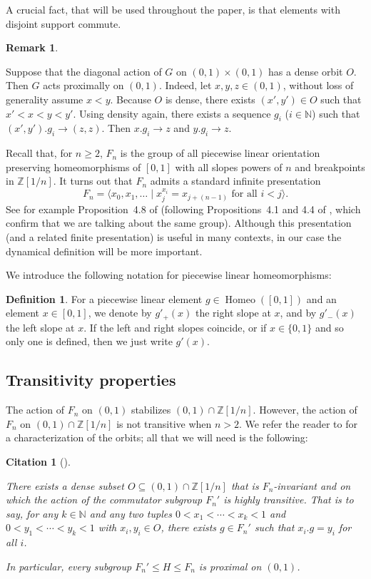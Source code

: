 \documentclass[reqno,12pt]{amsart}\setcounter{tocdepth}{1}
\newtheorem{cit}[theorem]{Citation}
\theoremstyle{definition}
\newtheorem{definition}[theorem]{Definition}
\newtheorem{remark}[theorem]{Remark}
\newcommand{\N}{\mathbb{N}}
\newcommand{\Z}{\mathbb{Z}}
\DeclareMathOperator{\Homeo}{Homeo}
\numberwithin{equation}{section}
\begin{document}
A crucial fact, that will be used throughout the paper, is that elements with disjoint support commute.

\begin{remark}
\label{rem:proximal}

Suppose that the diagonal action of $G$ on $(0, 1) \times (0, 1)$ has a dense orbit $O$. Then $G$ acts proximally on $(0, 1)$. Indeed, let $x, y, z \in (0, 1)$, without loss of generality assume $x < y$. Because $O$ is dense, there exists $(x', y') \in O$ such that $x' < x < y < y'$. Using density again, there exists a sequence $g_i$ ($i \in \N$) such that $(x', y').g_i \to (z, z)$. Then $x.g_i \to z$ and $y.g_i \to z$.
\end{remark}

Recall that, for $n\ge 2$, $F_n$ is the group of all piecewise linear orientation preserving homeomorphisms of $[0,1]$ with all slopes powers of $n$ and breakpoints in $\Z[1/n]$. It turns out that $F_n$ admits a standard infinite presentation
\[
F_n=\langle x_0,x_1,\dots\mid x_j^{x_i} = x_{j+(n-1)} \text{ for all } i<j\rangle \text{.}
\]
See for example Proposition~4.8 of \cite{brown87} (following Propositions~4.1 and 4.4 of \cite{brown87}, which confirm that we are talking about the same group). Although this presentation (and a related finite presentation) is useful in many contexts, in our case the dynamical definition will be more important.

We introduce the following notation for piecewise linear homeomorphisms:

\begin{definition}
For a piecewise linear element $g \in \Homeo([0, 1])$ and an element $x \in [0, 1]$, we denote by $g'_+(x)$ the right slope at $x$, and by $g'_-(x)$ the left slope at $x$. If the left and right slopes coincide, or if $x \in \{0, 1\}$ and so only one is defined, then we just write $g'(x)$.
\end{definition}


\subsection{Transitivity properties}

The action of $F_n$ on $(0,1)$ stabilizes $(0,1)\cap \Z[1/n]$. However, the action of $F_n$ on $(0,1)\cap \Z[1/n]$ is not transitive when $n > 2$. We refer the reader to \cite[Section 3]{hydelodha} for a characterization of the orbits; all that we will need is the following:

\begin{cit}[{\cite[Section 3]{hydelodha}}]
\label{cit:proximal}

There exists a dense subset $O \subseteq (0, 1) \cap \Z[1/n]$ that is $F_n$-invariant and on which the action of the commutator subgroup $F_n'$ is highly transitive. That is to say, for any $k\in\N$ and any two tuples $0 < x_1 < \cdots < x_k < 1$ and $0 < y_1 < \cdots < y_k < 1$ with $x_i, y_i \in O$, there exists $g \in F_n'$ such that $x_i.g = y_i$ for all $i$.

In particular, every subgroup $F_n' \leq H \leq F_n$ is proximal on $(0, 1)$.
\end{cit}
\end{document}
